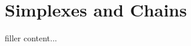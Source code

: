 \documentclass[../../templates/section]{subfiles}
\begin{document}
\section{Simplexes and Chains}\label{sec:simplexes-and-chains}

filler content...
\end{document}
